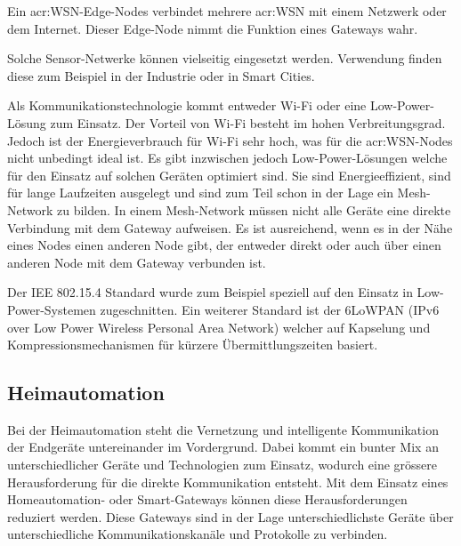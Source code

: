 Ein \gls{acr:WSN}-Edge-Nodes verbindet mehrere \gls{acr:WSN} mit einem Netzwerk oder dem Internet. Dieser Edge-Node nimmt die Funktion eines Gateways wahr.

Solche Sensor-Netwerke können vielseitig eingesetzt werden. Verwendung finden diese zum Beispiel in der Industrie oder in Smart Cities.

Als Kommunikationstechnologie kommt entweder Wi-Fi oder eine Low-Power-Lösung zum Einsatz. Der Vorteil von Wi-Fi besteht im hohen Verbreitungsgrad. Jedoch ist der Energieverbrauch für Wi-Fi sehr hoch, was für die \gls{acr:WSN}-Nodes nicht unbedingt ideal ist. Es gibt inzwischen jedoch Low-Power-Lösungen welche für den Einsatz auf solchen Geräten optimiert sind. Sie sind Energieeffizient, sind für lange Laufzeiten ausgelegt und sind zum Teil schon in der Lage ein Mesh-Network zu bilden. In einem Mesh-Network müssen nicht alle Geräte eine direkte Verbindung mit dem Gateway aufweisen. Es ist ausreichend, wenn es in der Nähe eines Nodes einen anderen Node gibt, der entweder direkt oder auch über einen anderen Node mit dem Gateway verbunden ist.

Der IEE 802.15.4 Standard wurde zum Beispiel speziell auf den Einsatz in Low-Power-Systemen zugeschnitten. Ein weiterer Standard ist der 6LoWPAN (IPv6 over Low Power Wireless Personal Area Network) welcher auf Kapselung und Kompressionsmechanismen für kürzere Übermittlungszeiten basiert.


\subsection{Heimautomation} 
Bei der Heimautomation steht die Vernetzung und intelligente Kommunikation der Endgeräte untereinander im Vordergrund. Dabei kommt ein bunter Mix an unterschiedlicher Geräte und Technologien zum Einsatz, wodurch eine grössere Herausforderung für die direkte Kommunikation entsteht. Mit dem Einsatz eines Homeautomation- oder Smart-Gateways können diese Herausforderungen reduziert werden. Diese Gateways sind in der Lage unterschiedlichste Geräte über unterschiedliche Kommunikationskanäle und Protokolle zu verbinden.



